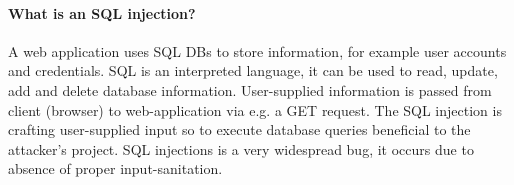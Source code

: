 \paragraph{What is an SQL injection?}
A web application uses SQL DBs to store information, for example user accounts and credentials. SQL is an interpreted language, it can be used to read, update, add and delete database information. User-supplied information is passed from client (browser) to web-application via e.g. a GET request. The SQL injection is crafting user-supplied input so to execute database queries beneficial to the attacker's project. SQL injections is a very widespread bug, it occurs due to absence of proper input-sanitation. 

